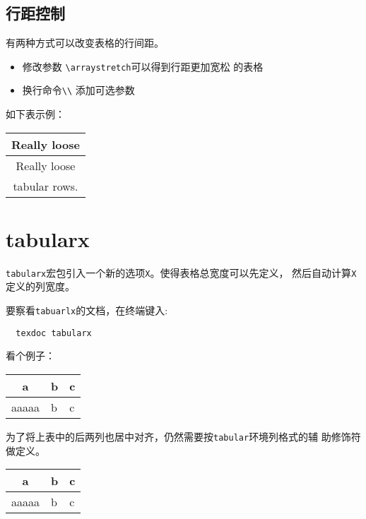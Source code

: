 \documentclass{article}
\begin{document}
\subsection{行距控制}

有两种方式可以改变表格的行间距。
\begin{itemize}
\item 修改参数 \verb!\arraystretch!可以得到行距更加宽松
的表格
\item 换行命令\verb!\\! 添加可选参数
\end{itemize}

如下表示例：
  
\renewcommand\arraystretch{1.8}
\begin{table}[H]
  \centering
  \begin{tabular}{|c|}
    \hline
    Really loose \\  \hline
    Really loose \\ [6pt] \hline
    tabular rows.\\ \hline
  \end{tabular}
\end{table}
\renewcommand\arraystretch{1}
\section{tabularx}

\texttt{tabularx}宏包引入一个新的选项\texttt{X}。使得表格总宽度可以先定义，
然后自动计算\verb!X!定义的列宽度。

要察看\texttt{tabuarlx}的文档，在终端键入:
\begin{verbatim}
  texdoc tabularx
\end{verbatim}

看个例子：

\begin{table}[h!]
  \centering
  \begin{tabularx}{0.8\textwidth}{|c|X|X|}
    \hline
    a &  b & c \\
    \hline
    aaaaa &  b & c  \\
    \hline
  \end{tabularx}
\end{table}

为了将上表中的后两列也居中对齐，仍然需要按\texttt{tabular}环境列格式的辅
助修饰符做定义。

\begin{table}[h!]
  \centering
  \begin{tabularx}{0.8\textwidth}{|c|>{\centering\arraybackslash}X|X|}
    \hline
    a &  b & c \\
    \hline
    aaaaa &  b & c  \\
    \hline
  \end{tabularx}
\end{table}
\end{document}

